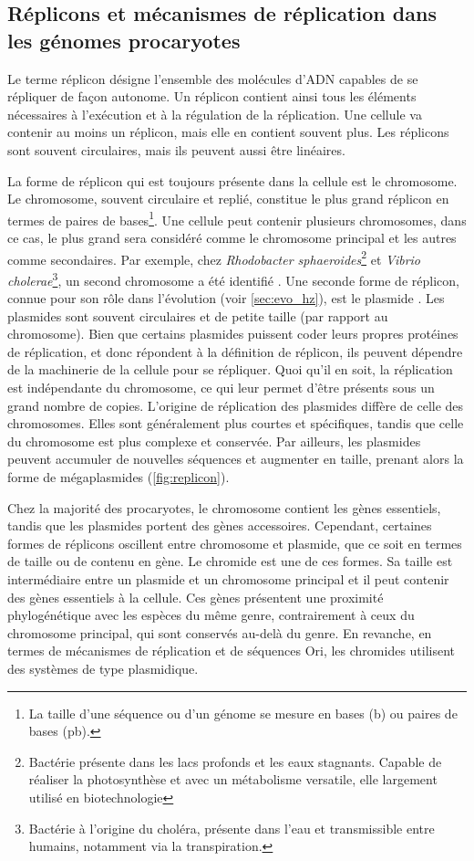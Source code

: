 \subsection{Réplicons et mécanismes de réplication dans les génomes procaryotes}
\label{sec:replicons}
Le terme réplicon désigne l’ensemble des molécules d’ADN capables de se répliquer de façon autonome. Un réplicon contient ainsi tous les éléments nécessaires à l’exécution et à la régulation de la réplication. Une cellule va contenir au moins un réplicon, mais elle en contient souvent plus. Les réplicons sont souvent circulaires, mais ils peuvent aussi être linéaires.

La forme de réplicon qui est toujours présente dans la cellule est le chromosome. Le chromosome, souvent circulaire et replié, constitue le plus grand réplicon en termes de paires de bases\footnote{La taille d’une séquence ou d’un génome se mesure en bases (b) ou paires de bases (pb).}. Une cellule peut contenir plusieurs chromosomes, dans ce cas, le plus grand sera considéré comme le chromosome principal et les autres comme secondaires. Par exemple, chez \textit{Rhodobacter sphaeroides}\footnote{Bactérie présente dans les lacs profonds et les eaux stagnants. Capable de réaliser la photosynthèse et avec un métabolisme versatile, elle largement utilisé en biotechnologie} et \textit{Vibrio cholerae}\footnote{ Bactérie à l’origine du choléra, présente dans l’eau et transmissible entre humains, notamment via la transpiration.}, un second chromosome a été identifié \cite{suwanto_physical_1989,trucksis_vibrio_1998}.
\newpage
Une seconde forme de réplicon, connue pour son rôle dans l’évolution (voir \autoref{sec:evo_hz}), est le plasmide \cite{lederberg_gene_1946,lederberg_sex_1953}. Les plasmides sont souvent circulaires et de petite taille (par rapport au chromosome). Bien que certains plasmides puissent coder leurs propres protéines de réplication, et donc répondent à la définition de réplicon, ils peuvent dépendre de la machinerie de la cellule pour se répliquer. Quoi qu'il en soit, la réplication est indépendante du chromosome, ce qui leur permet d'être présents sous un grand nombre de copies. L’origine de réplication des plasmides diffère de celle des chromosomes. Elles sont généralement plus courtes et spécifiques, tandis que celle du chromosome est plus complexe et conservée. Par ailleurs, les plasmides peuvent accumuler de nouvelles séquences et augmenter en taille, prenant alors la forme de mégaplasmides (\autoref{fig:replicon}).

Chez la majorité des procaryotes, le chromosome contient les gènes essentiels, tandis que les plasmides portent des gènes accessoires. Cependant, certaines formes de réplicons oscillent entre chromosome et plasmide, que ce soit en termes de taille ou de contenu en gène. Le chromide \cite{harrison_introducing_2010} est une de ces formes. Sa taille est intermédiaire entre un plasmide et un chromosome principal et il peut contenir des gènes essentiels à la cellule. Ces gènes présentent une proximité phylogénétique avec les espèces du même genre, contrairement à ceux du chromosome principal, qui sont conservés au-delà du genre. En revanche, en termes de mécanismes de réplication et de séquences Ori, les chromides utilisent des systèmes de type plasmidique.


